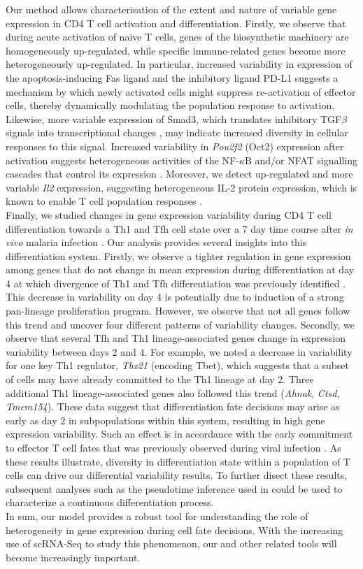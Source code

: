 Our method allows characterisation of the extent and nature of variable gene expression in CD4\plus{} T cell activation and differentiation. Firstly, we observe that during acute activation of naive T cells, genes of the biosynthetic machinery are homogeneously up-regulated, while specific immune-related genes become more heterogeneously up-regulated. In particular, increased variability in expression of the apoptosis-inducing Fas ligand \citep{Strasser2009} and the inhibitory ligand PD-L1 \citep{Chikuma2016} suggests a mechanism by which newly activated cells might suppress re-activation of effector cells, thereby dynamically modulating the population response to activation. Likewise, more variable expression of Smad3, which translates inhibitory TGF$\beta$ signals into transcriptional changes \citep{Delisle2013}, may indicate increased diversity in cellular responses to this signal. Increased variability in \textit{Pou2f2} (Oct2) expression after activation suggests heterogeneous activities of the NF-$\kappa$B and/or NFAT signalling cascades that control its expression \citep{Mueller2013}.
Moreover, we detect up-regulated and more variable \textit{Il2} expression, suggesting heterogeneous IL-2 protein expression, which is known to enable T cell population responses \citep{Fuhrmann2016}. \\

Finally, we studied changes in gene expression variability during CD4\plus{} T cell differentiation towards a Th1 and Tfh cell state over a 7 day time course after \textit{in vivo} malaria infection \citep{Lonnberg2017}. Our analysis provides several insights into this differentiation system. Firstly, we observe a tighter regulation in gene expression among genes that do not change in mean expression during differentiation at day 4 at which divergence of Th1 and Tfh differentiation was previously identified \citep{Lonnberg2017}. This decrease in variability on day 4 is potentially due to induction of a strong pan-lineage proliferation program. However, we observe that not all genes follow this trend and uncover four different patterns of variability changes. Secondly, we observe that several Tfh and Th1 lineage-associated genes change in expression variability between days 2 and 4. For example, we noted a decrease in variability for one key Th1 regulator, \textit{Tbx21} (encoding Tbet), which suggests that a subset of cells may have already committed to the Th1 lineage at day 2. Three additional Th1 lineage-associated genes also followed this trend (\textit{Ahnak}, \textit{Ctsd}, \textit{Tmem154}). These data suggest that differentiation fate decisions may arise as early as day 2 in subpopulations within this system, resulting in high gene expression variability. Such an effect is in accordance with the early commitment to effector T cell fates that was previously observed during viral infection \citep{Choi2011}. As these results illustrate, diversity in differentiation state within a population of T cells can drive our differential variability results. To further disect these results, subsequent analyses such as the pseudotime inference used in \cite{Lonnberg2017} could be used to characterize a continuous differentiation process.\\

In sum, our model provides a robust tool for understanding the role of heterogeneity in gene expression during cell fate decisions. With the increasing use of scRNA-Seq to study this phenomenon, our and other related tools will become increasingly important.



